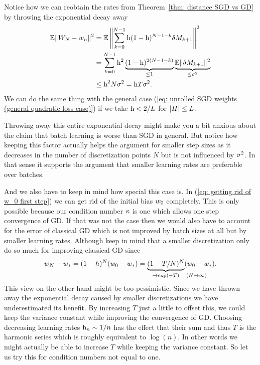 Notice how we can reobtain the rates from Theorem~\ref{thm: distance SGD vs GD}
by throwing the exponential decay away
\begin{align*}
	\mathbb{E}\|W_N-w_n\|^2
	&= \mathbb{E}\left\|\sum_{k=0}^{N-1}\text{h}(1-\text{h})^{N-1-k}\delta M_{k+1}\right\|^2\\
	&= \sum_{k=0}^{N-1}\text{h}^2\underbrace{(1-\text{h})^{2(N-1-k)}}_{\le1}
	\underbrace{\mathbb{E}\|\delta M_{k+1}\|^2}_{\le \sigma^2}\\
	&\le \text{h}^2 N \sigma^2 = \text{h} T\sigma^2.
\end{align*}
We can do the same thing with the general case (\ref{eq: unrolled SGD weights
(general quadratic loss case)}) if we take \(\text{h}<2/L\) for \(|H|\le L\).

Throwing away this entire exponential decay might make you a bit anxious about
the claim that batch learning is worse than SGD in general. But notice how
keeping this factor actually helps the argument for smaller step sizes as it
decreases in the number of discretization points \(N\) but is not influenced by
\(\sigma^2\). In that sense it supports the argument that smaller learning
rates are preferable over batches.

And we also have to keep in mind how special this case is. In (\ref{eq: getting
rid of w_0 first step}) we can get rid of the initial bias \(w_0\)
completely. This is only possible because our condition number \(\kappa\) is
one which allows one step convergence of GD. If that was not the case then we
would also have to account for the error of classical GD which is not improved
by batch sizes at all but by smaller learning rates. Although keep in mind that
a smaller discretization only do so much for improving classical GD since
\begin{align*}
	\weights_N - \minimum = (1- h)^N (\weights_0 - \minimum)
	= \underbrace{(1- T/N)^N}_{\to \exp(-T) \mathrlap{\quad (N\to\infty)}}(\weights_0 - \minimum).
\end{align*}
This view on the other hand might be too pessimistic. Since we have thrown away
the exponential decay caused by smaller discretizations we have underestimated
its benefit. By increasing \(T\) just a little to offset this, 
we could keep the variance constant while improving the
convergence of GD. Choosing decreasing learning rates \(\text{h}_n\sim1/n\)
has the effect that their sum and thus \(T\) is the harmonic series which is
roughly equivalent to \(\log(n)\). In other words we might actually be able
to increase \(T\) while keeping the variance constant. So let us try this
for condition numbers not equal to one.

